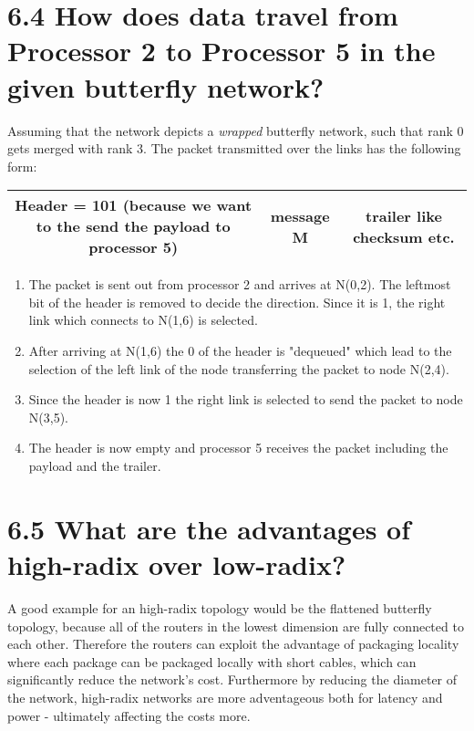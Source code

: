 \documentclass{article}
\begin{document}
	\section*{6.4 How does data travel from Processor 2 to Processor 5 in the given butterfly network?}
	\begin{adjustwidth}{2em}{2em}
		Assuming that the network depicts a \textit{wrapped} butterfly network, such that rank 0 gets merged with rank 3. The packet transmitted over the links has the following form: \\
		\begin{adjustwidth}{-5em}{}
			\begin{tabular}{|c|c|c|}
				\hline
				Header = 101 (because we want to the send the payload to processor 5) & message M & trailer like checksum etc. \\
				\hline
			\end{tabular}
		\end{adjustwidth}
		\begin{enumerate}[\small \textbullet]
			\item The packet is sent out from processor 2 and arrives at N(0,2). The leftmost bit of the header is removed to decide the direction. Since it is 1, the right link which connects to N(1,6) is selected.
			\item After arriving at N(1,6) the 0 of the header is "dequeued" which lead to the selection of the left link of the node transferring the packet to node N(2,4).
			\item Since the header is now 1 the right link is selected to send the packet to node N(3,5).
			\item The header is now empty and processor 5 receives the packet including the payload and the trailer.
		\end{enumerate}
	\end{adjustwidth}
	
	\section*{6.5 What are the advantages of high-radix over low-radix?}
	\begin{adjustwidth}{2em}{2em}
		A good example for an high-radix topology would be the flattened butterfly topology, because all of the routers in the lowest dimension are fully connected to each other. Therefore the routers can exploit the advantage of packaging locality where each package can be packaged locally with short cables, which can significantly reduce the network's cost. Furthermore by reducing the diameter of the network, high-radix networks are more adventageous both for latency and power - ultimately affecting the costs more.
	\end{adjustwidth}
	
\end{document}
